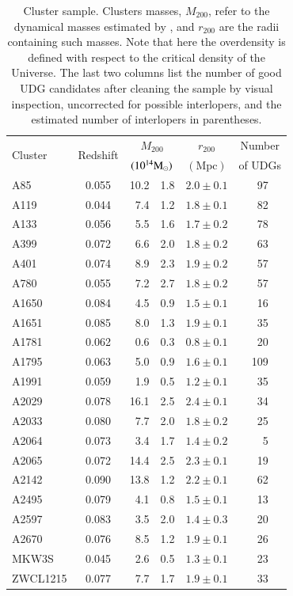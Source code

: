 \documentclass[usenatbib,fleqn]{mnras}
\begin{document}
\begin{table}
 \centering
\caption{Cluster sample. Clusters masses, $M_{200}$, refer to the dynamical masses estimated by \citet{sifon15_cccp}, and $r_{200}$ are the radii containing such masses. Note that here the overdensity is defined with respect to the critical density of the Universe. The last two columns list the number of good UDG candidates after cleaning the sample by visual inspection, uncorrected for possible interlopers, and the estimated number of interlopers in parentheses.}
\label{t:clusters}
\begin{tabular}{l c r@{ $\pm$ }l c c}
\hline\hline
 \multirow{2}{*}{Cluster} & \multirow{2}{*}{Redshift} & \multicolumn{2}{c}{$M_{200}$} & $r_{200}$ & Number \\
         &          & \multicolumn{2}{c}{$(10^{14}\mathrm{M}_\odot)$} & $(\mathrm{Mpc})$ & of UDGs  \\[0.5ex]
\hline
%
A85        & 0.055 & 10.2 & 1.8 & $2.0\pm0.1$ &      \,\,\,97 \\
A119       & 0.044 &  7.4 & 1.2 & $1.8\pm0.1$ &      \,\,\,82 \\
A133       & 0.056 &  5.5 & 1.6 & $1.7\pm0.2$ &      \,\,\,78 \\
A399       & 0.072 &  6.6 & 2.0 & $1.8\pm0.2$ &      \,\,\,63 \\
A401       & 0.074 &  8.9 & 2.3 & $1.9\pm0.2$ &      \,\,\,57 \\
A780       & 0.055 &  7.2 & 2.7 & $1.8\pm0.2$ &      \,\,\,57 \\
A1650      & 0.084 &  4.5 & 0.9 & $1.5\pm0.1$ &      \,\,\,16 \\
A1651      & 0.085 &  8.0 & 1.3 & $1.9\pm0.1$ &      \,\,\,35 \\
A1781      & 0.062 &  0.6 & 0.3 & $0.8\pm0.1$ &      \,\,\,20 \\
A1795      & 0.063 &  5.0 & 0.9 & $1.6\pm0.1$ &           109 \\
A1991      & 0.059 &  1.9 & 0.5 & $1.2\pm0.1$ &      \,\,\,35 \\
A2029      & 0.078 & 16.1 & 2.5 & $2.4\pm0.1$ &      \,\,\,34 \\
A2033      & 0.080 &  7.7 & 2.0 & $1.8\pm0.2$ &      \,\,\,25 \\
A2064      & 0.073 &  3.4 & 1.7 & $1.4\pm0.2$ & \,\,\,\,\,\,5 \\
A2065      & 0.072 & 14.4 & 2.5 & $2.3\pm0.1$ &      \,\,\,19 \\
A2142      & 0.090 & 13.8 & 1.2 & $2.2\pm0.1$ &      \,\,\,62 \\
A2495      & 0.079 &  4.1 & 0.8 & $1.5\pm0.1$ &      \,\,\,13 \\
A2597      & 0.083 &  3.5 & 2.0 & $1.4\pm0.3$ &      \,\,\,20 \\
A2670      & 0.076 &  8.5 & 1.2 & $1.9\pm0.1$ &      \,\,\,26 \\
MKW3S      & 0.045 &  2.6 & 0.5 & $1.3\pm0.1$ &      \,\,\,23 \\
ZWCL1215   & 0.077 &  7.7 & 1.7 & $1.9\pm0.1$ &      \,\,\,33 \\
[0.5ex]
\hline
\end{tabular}
\end{table}
\end{document}
